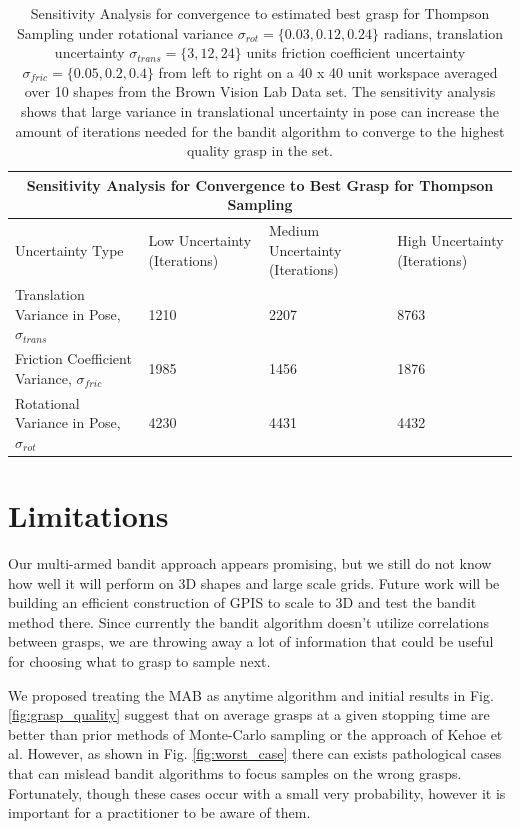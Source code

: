 \documentclass[journal,transmag]{IEEEtran}%
\begin{document}
\begin{table}[t]
\centering
\begin{tabular}{ |p{4.5cm}||p{2cm}|p{2.5cm}|p{2cm}|  }
 \hline
 \multicolumn{4}{|c|}{Sensitivity Analysis for Convergence to Best Grasp for Thompson Sampling} \\
 \hline
Uncertainty Type & Low Uncertainty (Iterations) & Medium Uncertainty (Iterations) & High Uncertainty (Iterations)\\
 \hline
Translation Variance in Pose, $\sigma_{trans}$ & 1210    & 2207 &  8763\\
Friction Coefficient Variance, $\sigma_{fric}$ &  1985  & 1456   & 1876\\
Rotational Variance in Pose, $\sigma_{rot}$ & 4230 & 4431 &  4432\\
 \hline
\end{tabular}
   \caption { \footnotesize  Sensitivity Analysis for convergence to estimated best grasp for Thompson Sampling under rotational variance $\sigma_{rot} = \lbrace 0.03,0.12, 0.24 \rbrace$ radians,  translation uncertainty $\sigma_{trans} = \lbrace 3, 12, 24 \rbrace$ units  friction coefficient uncertainty $\sigma_{fric} = \lbrace 0.05,0.2, 0.4 \rbrace$  from left to right on a 40 x 40 unit workspace averaged over 10 shapes from the Brown Vision Lab Data set. The sensitivity analysis shows that large variance in translational uncertainty in pose can increase the amount of iterations needed for the bandit algorithm to converge to the highest quality grasp in the set. 
   }
\vspace*{-20pt}
\end{table}


\section{Limitations} 

Our multi-armed bandit approach appears promising, but we still do not know how well it will perform on 3D shapes and large scale grids. Future work will be building an efficient construction of GPIS to scale to 3D and test the bandit method there. Since currently the bandit algorithm doesn't utilize correlations between grasps, we are throwing away a lot of information that could be useful for choosing what to grasp to sample next. 

We proposed treating the MAB as anytime algorithm and initial results in Fig. \ref{fig:grasp_quality} suggest that on average grasps at a given stopping time are better than prior methods of Monte-Carlo sampling or the approach of Kehoe et al. However, as shown in Fig. \ref{fig:worst_case} there can exists pathological cases that can mislead bandit algorithms to focus samples on the wrong grasps. Fortunately, though these cases occur with a small very probability, however it is important for a practitioner to be aware of them. 
\end{document}
